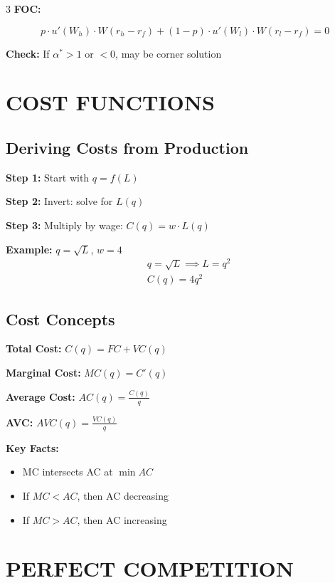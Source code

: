 \documentclass[8pt,landscape,letterpaper]{extarticle}
\begin{document}
\begin{multicols}{3}
\textbf{FOC:}
\begin{keybox}
\[
p \cdot u'(W_h) \cdot W(r_h - r_f) + (1-p) \cdot u'(W_l) \cdot W(r_l - r_f) = 0
\]
\end{keybox}

\textbf{Check:} If $\alpha^* > 1$ or $< 0$, may be corner solution

\columnbreak

\section*{COST FUNCTIONS}

\subsection*{Deriving Costs from Production}
\textbf{Step 1:} Start with $q = f(L)$

\textbf{Step 2:} Invert: solve for $L(q)$

\textbf{Step 3:} Multiply by wage: $C(q) = w \cdot L(q)$

\textbf{Example:} $q = \sqrt{L}$, $w = 4$
\begin{align*}
&q = \sqrt{L} \implies L = q^2 \\
&C(q) = 4q^2
\end{align*}

\subsection*{Cost Concepts}
\begin{keybox}
\textbf{Total Cost:} $C(q) = FC + VC(q)$

\textbf{Marginal Cost:} $MC(q) = C'(q)$

\textbf{Average Cost:} $AC(q) = \frac{C(q)}{q}$

\textbf{AVC:} $AVC(q) = \frac{VC(q)}{q}$
\end{keybox}

\textbf{Key Facts:}
\begin{itemize}
\item MC intersects AC at $\min AC$
\item If $MC < AC$, then AC decreasing
\item If $MC > AC$, then AC increasing
\end{itemize}

\section*{PERFECT COMPETITION}


\end{multicols}
\end{document}
